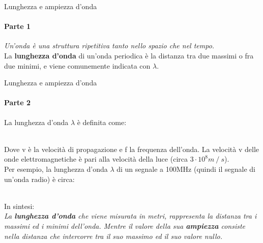 \documentclass[aspectratio=169]{beamer}
\newcommand*{\vet}{\fontfamily{qzc}\selectfont}
\begin{document}
\begin{frame}{Lunghezza e ampiezza d'onda}
	\framesubtitle{Parte 1}
	\emph{Un'onda è una struttura ripetitiva tanto nello spazio che nel tempo.}\\
	\smallskip
	La \textbf{lunghezza d'onda} di un'onda periodica è la distanza tra due massimi o fra due minimi, e viene comunemente indicata con $\lambda$.\\
\end{frame}

\begin{frame}{Lunghezza e ampiezza d'onda}
	\framesubtitle{Parte 2}
	La lunghezza d'onda $\lambda$ è definita come:\\
	\medskip
	\centering{$\lambda = \frac{{\vet v}}{{\vet f}}$}\\
	\smallskip
	\raggedright{Dove {\vet v} è la velocità di propagazione e {\vet f} la frequenza dell'onda. La velocità {\vet v} delle onde elettromagnetiche è pari alla velocità della luce (circa $3 \cdot 10^8 m\mathbin{/}s$)}.\\
	\medskip
	Per esempio, la lunghezza d'onda $\lambda$ di un segnale a 100MHz (quindi il segnale di un'onda radio) è circa:\\
	\medskip
	\\
	\medskip
	\raggedright{In sintesi:}\\
	\emph{La \textbf{lunghezza d'onda} che viene misurata in metri, rappresenta la distanza tra i massimi ed i minimi dell'onda. Mentre il valore della sua \textbf{ampiezza} consiste nella distanza che intercorre tra il suo massimo ed il suo valore nullo.}
\end{frame}
\end{document}
